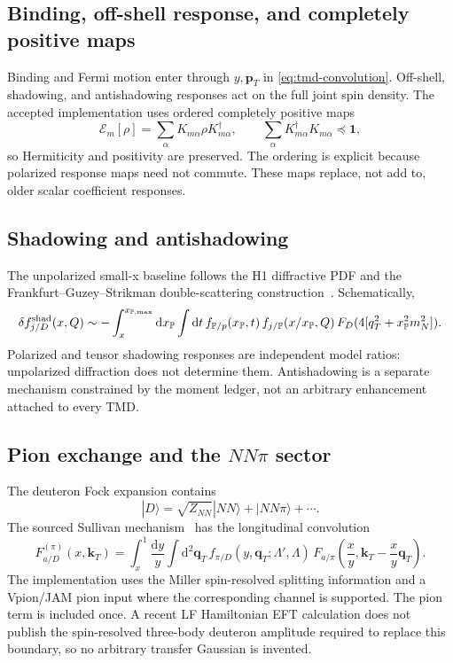 \documentclass[11pt]{article}
\newcommand{\kT}{\bm{k}_{T}}
\newcommand{\pT}{\bm{p}_{T}}
\newcommand{\dd}{\mathrm{d}}
\begin{document}
\subsection{Binding, off-shell response, and completely positive maps}

Binding and Fermi motion enter through \(y,\pT\) in
\cref{eq:tmd-convolution}.  Off-shell, shadowing, and antishadowing
responses act on the full joint spin density.  The accepted implementation
uses ordered completely positive maps
\begin{equation}
\mathcal E_m[\rho]
=\sum_\alpha K_{m\alpha}\rho K_{m\alpha}^\dagger,
\qquad
\sum_\alpha K_{m\alpha}^\dagger K_{m\alpha}\preceq \mathbf 1,
\label{eq:kraus}
\end{equation}
so Hermiticity and positivity are preserved.  The ordering is explicit
because polarized response maps need not commute.  These maps replace, not
add to, older scalar coefficient responses.

\subsection{Shadowing and antishadowing}

The unpolarized small-x baseline follows the H1 diffractive PDF
\cite{H1DPDF} and the Frankfurt--Guzey--Strikman double-scattering
construction~\cite{FGS}.  Schematically,
\begin{equation}
\delta f_{j/D}^{\rm shad}(x,Q)
\sim -\int_x^{x_{\mathbb P,\max}}\dd x_{\mathbb P}
\int\dd t\,
f_{\mathbb P/p}(x_{\mathbb P},t)\,
f_{j/\mathbb P}(x/x_{\mathbb P},Q)\,
F_D(4[q_T^2+x_{\mathbb P}^2m_N^2]).
\label{eq:shadowing}
\end{equation}
Polarized and tensor shadowing responses are independent model ratios:
unpolarized diffraction does not determine them.  Antishadowing is a
separate mechanism constrained by the moment ledger, not an arbitrary
enhancement attached to every TMD.

\subsection{Pion exchange and the \(NN\pi\) sector}

The deuteron Fock expansion contains
\begin{equation}
|D\rangle=\sqrt{Z_{NN}}|NN\rangle+|NN\pi\rangle+\cdots .
\label{eq:fock}
\end{equation}
The sourced Sullivan mechanism~\cite{MillerPion} has the longitudinal convolution
\begin{equation}
F_{a/D}^{(\pi)}(x,\kT)
=\int_x^1\frac{\dd y}{y}
\int\dd^2\bm q_T\,
f_{\pi/D}(y,\bm q_T;\Lambda',\Lambda)\,
F_{a/\pi}\left(\frac{x}{y},
\kT-\frac{x}{y}\bm q_T\right).
\label{eq:pion-convolution}
\end{equation}
The implementation uses the Miller spin-resolved splitting information and
a Vpion/JAM pion input where the corresponding channel is supported.  The
pion term is included once.  A recent LF Hamiltonian EFT calculation does
not publish the spin-resolved three-body deuteron amplitude required to
replace this boundary, so no arbitrary transfer Gaussian is invented.
\end{document}
